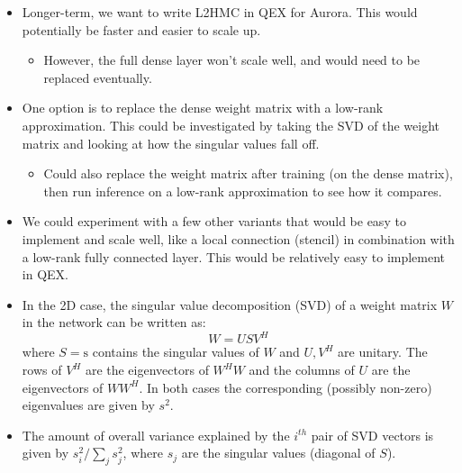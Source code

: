 \begin{itemize}
    \begin{itemize}
      \item Longer-term, we want to write L2HMC in QEX for Aurora. This would
        potentially be faster and easier to scale up.
        \begin{itemize}
          \item However, the full dense layer won't scale well, and would need
            to be replaced eventually.
        \end{itemize}
      \item \textbf{\color{red}{(AI7)}} One option is to replace the dense
        weight matrix with a low-rank approximation. This could be investigated
        by taking the SVD of the weight matrix and looking at how the singular
        values fall off.
        \begin{itemize}
          \item Could also replace the weight matrix after training (on the
            dense matrix), then run inference on a low-rank approximation to
            see how it compares.
        \end{itemize}
      \item \textbf{\color{red}{(AI8)}} We could experiment with a few other
        variants that would be easy to implement and scale well, like a local
        connection (stencil) in combination with a low-rank fully connected
        layer. This would be relatively easy to implement in QEX.\@
      \item In the 2D case, the singular value decomposition (SVD) of a weight
        matrix \(W\) in the network can be written as:
        \begin{equation}
          W = USV^{H}
        \end{equation}
        where \(S = \mathrm{s}\) contains the singular values of \(W\) and \(U,
        V^{H}\) are unitary. The rows of \(V^{H}\) are the eigenvectors of
        \(W^{H}W\) and the columns of \(U\) are the eigenvectors of \(WW^{H}\).
        In both cases the corresponding (possibly non-zero) eigenvalues are
        given by \(s^{2}\).
      \item The amount of overall variance explained by the \(i^{th}\) pair of
        SVD vectors is given by \(s_{i}^2 / \sum_{j} s_{j}^{2}\), where
        \(s_{j}\) are the singular values (diagonal of \(S\)).
    \end{itemize}

\end{itemize}
